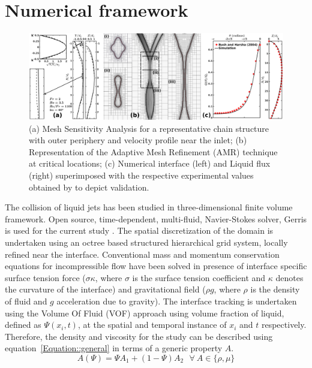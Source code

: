 \documentclass{jfm}
\begin{document}
\section{Numerical framework}
\begin{figure}
	\centering
	\includegraphics[width=\linewidth]{Figure2}
	\caption{(a) Mesh Sensitivity Analysis for a representative chain structure with outer periphery and velocity profile near the inlet; (b) Representation of the Adaptive Mesh Refinement (AMR) technique at critical locations; (c) Numerical interface (left) and Liquid flux (right) superimposed with the respective experimental values obtained by \cite{bush2004collision} to depict validation.}
	\label{Figure::gisetal}%
\end{figure}
The collision of liquid jets has been studied in three-dimensional finite volume framework. Open source, time-dependent, multi-fluid, Navier-Stokes solver, Gerris is used for the current study \citep{Popinet2003}. The spatial discretization of the domain is undertaken using an octree based structured hierarchical grid system, locally refined near the interface. Conventional mass and momentum conservation equations for incompressible flow have been solved in presence of interface specific surface tension force ($\sigma \kappa$, where $\sigma$ is the surface tension coefficient and $\kappa$ denotes the curvature of the interface) and gravitational field ($\rho g$, where $\rho$ is the density of fluid and $g$ acceleration due to gravity). The interface tracking is undertaken using the Volume Of Fluid (VOF) approach using volume fraction of liquid, defined as $\Psi(x_i, t)$, at the spatial and temporal instance of $x_i$ and $t$ respectively. Therefore, the density and viscosity for the study can be described using equation~\ref{Equation::general} in terms of a generic property $A$.
\begin{equation} \label{Equation::general}
A (\Psi) = \Psi A_1 + (1-\Psi)A_2 \: \: \:  \forall  \: A \in \{\rho, \mu\}
\end{equation}
\end{document}
